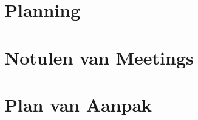 \documentclass[dutch]{tudelft-report}
\begin{document}
\appendix



\chapter{Planning} \label{ch:planning} 

\chapter{Notulen van Meetings} \label{ch:notulen-van-meetings} 

\chapter{Plan van Aanpak} \label{ch:plan-van-aanpak} 


\end{document}
